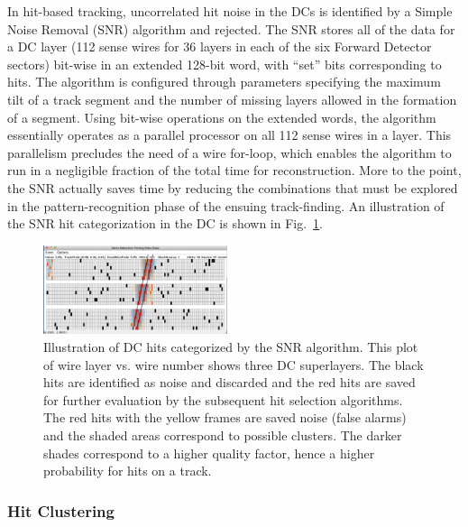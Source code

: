 In hit-based tracking, uncorrelated hit noise in the DCs is identified by a Simple Noise Removal (SNR) algorithm
and rejected. The SNR stores all of the data for a DC layer (112 sense wires for 36 layers in each of the six Forward
Detector sectors) bit-wise in an extended 128-bit word, with ``set'' bits corresponding to hits. The algorithm is
configured through parameters specifying the maximum tilt of a track segment and the number of missing layers
allowed in the formation of a segment. Using bit-wise operations on the extended words, the algorithm essentially
operates as a parallel processor on all 112 sense wires in a layer. This parallelism precludes the need of a wire
for-loop, which enables the algorithm to run in a negligible fraction of the total time for reconstruction. More to the
point, the SNR actually saves time by reducing the combinations that must be explored in the pattern-recognition
phase of the ensuing track-finding. An illustration of the SNR hit categorization in the DC is shown in
Fig.~\ref{fig:snr}.

\begin{figure}
\centering
\includegraphics[width=0.48\textwidth]{pics/dcPattern9.png}
\caption{Illustration of DC hits categorized by the SNR algorithm. This plot of wire layer vs. wire number shows
  three DC superlayers. The black hits are identified as noise and discarded and the red hits are saved for further
  evaluation by the subsequent hit selection algorithms. The red hits with the yellow frames are saved noise (false
  alarms) and the shaded areas correspond to possible clusters. The darker shades correspond to a higher quality
  factor, hence a higher probability for hits on a track.}
\label{fig:snr}
\end{figure}

\subsubsection{Hit Clustering}

